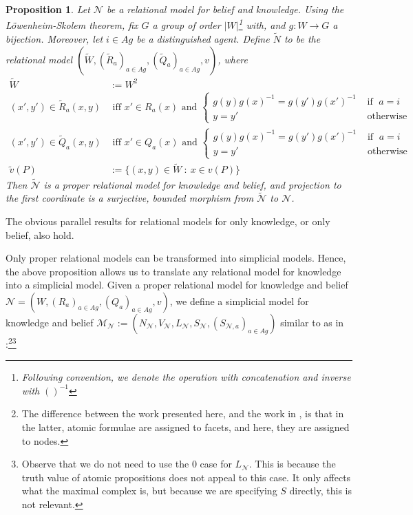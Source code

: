 \documentclass[11pt]{article}
\newtheorem{proposition}[theorem]{Proposition}
\theoremstyle{definition}
\newcommand{\M}{\mathcal{M}}
\renewcommand{\M}{\mathcal{M}}
\newcommand{\N}{\mathcal{N}}
\begin{document}
	\begin{proposition}
		Let $\N$ be a relational model for belief and knowledge. Using the L\"owenheim-Skolem theorem, fix $G$ a group of order $|W|$\footnote{Following convention, we denote the operation with concatenation and inverse with $()^{-1}$} with, and $g:W\rightarrow G$ a bijection. Moreover, let $i\in Ag$ be a distinguished agent. Define $\tilde{N}$ to be the relational model $(\tilde{W}, (\tilde{R}_a)_{a\in Ag}, (\tilde{Q}_a)_{a\in Ag}, v)$, where
		\begin{align*}
		\tilde{W}&:=W^2\\
		(x',y')\in\tilde{R}_a(x,y)&\text{ iff }x'\in R_a(x)\text{ and } \begin{cases}
		g(y)g(x)^{-1} = g(y')g(x')^{-1}& \text{ if }\;a=i\\
		y=y'& \text{ otherwise}
		\end{cases}\\
		(x',y')\in\tilde{Q}_a(x,y)&\text{ iff }x'\in Q_a(x)\text{ and } \begin{cases}
			g(y)g(x)^{-1} = g(y')g(x')^{-1}& \text{ if }\;a=i\\
			y=y'& \text{ otherwise}
		\end{cases}\\
	\tilde{v}(P)&:=\{(x,y) \in \tilde{W} \: : \: x \in v(P)\}
		\end{align*}
		Then $\tilde{\N}$ is a proper relational model for knowledge and belief, and projection to the first coordinate is a surjective, bounded morphism from $\tilde{\N}$ to $\N$.
	\end{proposition}

	The obvious parallel results for relational models for only knowledge, or only belief, also hold.
	
	Only proper relational models can be transformed into simplicial models. Hence, the above proposition allows us to translate any relational model for knowledge into a simplicial model.	Given a proper relational model for knowledge and belief $\N=(W,(R_a)_{a\in Ag},(Q_a)_{a\in Ag},v)$, we define a simplicial model for knowledge and belief $\M_{\N}:=(N_{\N},V_{\N},L_{\N},S_{\N},(S_{\N,a})_{a\in Ag})$ similar to as in \cite{BelSimp}:\footnote{The difference between the work presented here, and the work in \cite{BelSimp}, is that in the latter, atomic formulae are assigned to facets, and here, they are assigned to nodes.}\footnote{Observe that we do not need to use the 0 case for $L_\N$. This is because the truth value of atomic propositions does not appeal to this case. It only affects what the maximal complex is, but because we are specifying $S$ directly, this is not relevant.}
	
\end{document}
